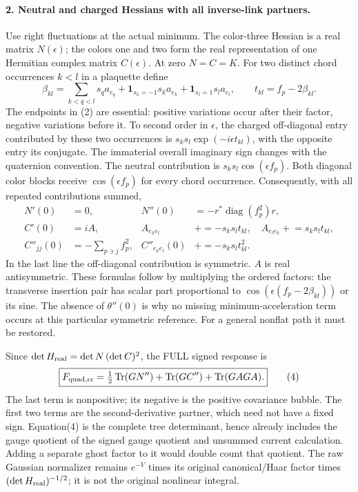 \documentclass[11pt]{article}
\begin{document}
\paragraph{2. Neutral and charged Hessians with all inverse-link partners.}
Use right fluctuations at the actual minimum. The color-three Hessian
is a real matrix $N(\epsilon)$; the colors one and two form the real
representation of one Hermitian complex matrix $C(\epsilon)$. At zero
$N=C=K$. For two distinct chord occurrences $k<l$ in a plaquette define
\[
 \beta_{kl}=\sum_{k<q<l}s_q a_{e_q}
       +\mathbf1_{s_k=-1}s_k a_{e_k}
       +\mathbf1_{s_l=1}s_l a_{e_l},\qquad
 t_{kl}=f_p-2\beta_{kl}.                                            \tag{2}
\]
The endpoints in (2) are essential: positive variations occur after their
factor, negative variations before it. To second order in $\epsilon$, the
charged off-diagonal entry contributed by these two occurrences is
$s_ks_l\exp(-i\epsilon t_{kl})$, with the opposite entry its conjugate.
The immaterial overall imaginary sign changes with the quaternion convention.
The neutral contribution is $s_ks_l\cos(\epsilon f_p)$. Both diagonal
color blocks receive $\cos(\epsilon f_p)$ for every chord occurrence.
Consequently, with all repeated contributions summed,
\begin{align}
 N'(0)&=0,& N''(0)&=-r^*\operatorname{diag}(f_p^2)r,\\
 C'(0)&=iA,& A_{e_ke_l}&\mathrel{+}=-s_ks_l t_{kl},\quad
 A_{e_le_k}\mathrel{+}=s_ks_l t_{kl},\\
 C''_{jj}(0)&=-\sum_{p\ni j}f_p^2,&
 C''_{e_ke_l}(0)&\mathrel{+}=-s_ks_l t_{kl}^2.                       \tag{3}
\end{align}
In the last line the off-diagonal contribution is symmetric. $A$ is real
antisymmetric. These formulas follow by multiplying the ordered factors:
the transverse insertion pair has scalar part proportional to
$\cos(\epsilon(f_p-2\beta_{kl}))$ or its sine. The absence of
$\theta''(0)$ is why no missing minimum-acceleration term occurs at this
particular symmetric reference. For a general nonflat path it must be restored.

Since $\det H_{\rm real}=\det N\,(\det C)^2$, the FULL signed response is
\[
 \boxed{F_{\rm quad,\epsilon\epsilon}
 =\tfrac12\operatorname{Tr}(G N'')+\operatorname{Tr}(G C'')
                         +\operatorname{Tr}(G A G A).}             \tag{4}
\]
The last term is nonpositive; its negative is the positive covariance
bubble. The first two terms are the second-derivative partner, which need
not have a fixed sign. Equation(4) is the complete tree determinant, hence
already includes the gauge quotient of the signed gauge quotient and unsummed current calculation. Adding a separate ghost
factor to it would double count that quotient. The raw Gaussian normalizer
remains $e^{-V}$ times its original canonical/Haar factor times
$(\det H_{\rm real})^{-1/2}$; it is not the original nonlinear integral.
\end{document}
